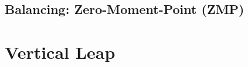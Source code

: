 		\subsection{Balancing: Zero-Moment-Point (ZMP)}
			
	\section{Vertical Leap}
		

%
%
%
%
%
%

%
%
%

%
%
%
